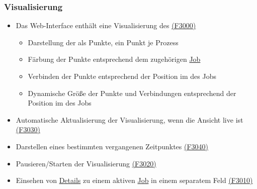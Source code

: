     \subsubsection{Visualisierung}    
        \begin{itemize}[noitemsep]
            \item Das \gls{Web-Interface} enthält eine Visualisierung des  \hyperref[FA:Visualisierung:Anzeigen des Systemzustandes]{(F3000)}
                \begin{itemize}[noitemsep]
                    \item Darstellung der  als Punkte, ein Punkt je \gls{Prozess} %
                    \item Färbung der Punkte entsprechend dem zugehörigen \hyperref[B:Jobs]{Job} 
                    \item Verbinden der Punkte entsprechend der Position im  des Jobs
                    \item Dynamische Größe der Punkte und Verbindungen entsprechend der Position im  des Jobs
                \end{itemize}
            \item Automatische Aktualisierung der Visualisierung, wenn die Ansicht live ist \hyperref[FA:Visualisierung:Starten der Visualisierung]{(F3030)}
            \item Darstellen eines bestimmten vergangenen Zeitpunktes \hyperref[FA:Visualisierung:Springen]{(F3040)}
            \item Pausieren/Starten der Visualisierung \hyperref[FA:Visualisierung:Pausieren der Visualisierung]{(F3020)}
            \item Einsehen von \hyperref[B:Job-Details]{Details} zu einem aktiven \hyperref[B:Jobs]{Job} in einem separatem Feld \hyperref[FA:Visualisierung:Anzeigen von Details]{(F3010)}
        \end{itemize}
    
